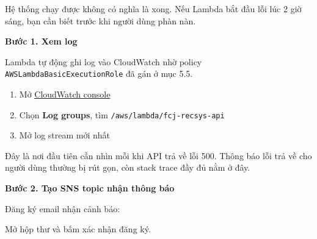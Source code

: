 Hệ thống chạy được không có nghĩa là xong. Nếu Lambda bắt đầu lỗi lúc 2
giờ sáng, bạn cần biết trước khi người dùng phàn nàn.

\vspace{0.5em}\noindent\textbf{Bước 1. Xem log}\par

Lambda tự động ghi log vào CloudWatch nhờ policy
\texttt{AWSLambdaBasicExecutionRole} đã gán ở mục 5.5.

\begin{enumerate}
\def\labelenumi{\arabic{enumi}.}
\tightlist
\item
  Mở
  \href{https://ap-southeast-1.console.aws.amazon.com/cloudwatch/home?region=ap-southeast-1}{CloudWatch
  console}
\item
  Chọn \textbf{Log groups}, tìm \texttt{/aws/lambda/fcj-recsys-api}
\item
  Mở log stream mới nhất
\end{enumerate}

Đây là nơi đầu tiên cần nhìn mỗi khi API trả về lỗi 500. Thông báo lỗi
trả về cho người dùng thường bị rút gọn, còn stack trace đầy đủ nằm ở
đây.

\vspace{0.5em}\noindent\textbf{Bước 2. Tạo SNS topic nhận thông
báo}\par

\begin{Shaded}
\begin{Highlighting}[]
\end{Highlighting}
\end{Shaded}

Đăng ký email nhận cảnh báo:

\begin{Shaded}
\begin{Highlighting}[]
\DataTypeTok{\textbackslash{}}
   \OperatorTok{\textless{}}\OperatorTok{\textgreater{}} \DataTypeTok{\textbackslash{}}
  \DataTypeTok{\textbackslash{}}
\end{Highlighting}
\end{Shaded}

Mở hộp thư và bấm xác nhận đăng ký.

